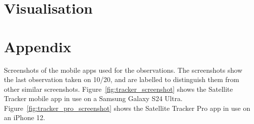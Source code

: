 \documentclass{article}
\begin{document}
\section{Visualisation}

\printbibliography

\newpage
\appendix
\section{Appendix} \label{Appendix}

Screenshots of the mobile apps used for the observations. The screenshots show the last observation taken on 10/20, and are labelled to distinguish them from other similar screenshots. Figure~\ref{fig:tracker_screenshot} shows the Satellite Tracker mobile app in use on a Samsung Galaxy S24 Ultra. Figure~\ref{fig:tracker_pro_screenshot} shows the Satellite Tracker Pro app in use on an iPhone 12.
\end{document}
